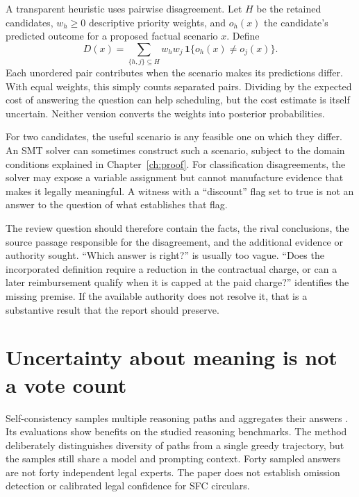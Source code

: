 \documentclass[12pt,a4paper,oneside,openany]{book}
\begin{document}
A transparent heuristic uses pairwise disagreement. Let $H$ be the retained
candidates, $w_h\geq0$ descriptive priority weights, and $o_h(x)$ the candidate's
predicted outcome for a proposed factual scenario $x$. Define
\begin{equation}
 D(x)=\sum_{\{h,j\}\subseteq H}w_h w_j\,
       \mathbf{1}\{o_h(x)\ne o_j(x)\}.
 \label{eq:disagreement-question}
\end{equation}
Each unordered pair contributes when the scenario makes its predictions differ.
With equal weights, this simply counts separated pairs. Dividing by the expected
cost of answering the question can help scheduling, but the cost estimate is
itself uncertain. Neither version converts the weights into posterior
probabilities.

For two candidates, the useful scenario is any feasible one on which they differ.
An SMT solver can sometimes construct such a scenario, subject to the domain
conditions explained in Chapter~\ref{ch:proof}. For classification disagreements,
the solver may expose a variable assignment but cannot manufacture evidence that
makes it legally meaningful. A witness with a ``discount'' flag set to true is not
an answer to the question of what establishes that flag.

The review question should therefore contain the facts, the rival conclusions,
the source passage responsible for the disagreement, and the additional evidence
or authority sought. ``Which answer is right?'' is usually too vague. ``Does the
incorporated definition require a reduction in the contractual charge, or can a
later reimbursement qualify when it is capped at the paid charge?'' identifies
the missing premise. If the available authority does not resolve it, that is a
substantive result that the report should preserve.

\section{Uncertainty about meaning is not a vote count}

Self-consistency samples multiple reasoning paths and aggregates their answers
\citep[section 2]{selfconsistency2023}. Its evaluations show benefits on the
studied reasoning benchmarks. The method deliberately distinguishes diversity of
paths from a single greedy trajectory, but the samples still share a model and
prompting context. Forty sampled answers are not forty independent legal experts.
The paper does not establish omission detection or calibrated legal confidence
for SFC circulars.
\end{document}
